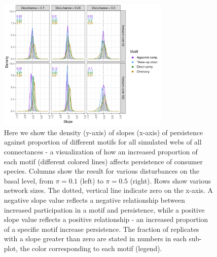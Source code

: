 \documentclass[12pt]{article}
\begin{document}
\begin{spacing}{2.0}
    
\begin{figure}[h!]
    \centering
        \includegraphics[width=0.75\textwidth]{figures/prop_dens_bp_vs_S_allC.pdf}
        \caption{Here we show the density (y-axis) of slopes (x-axis) of persistence against proportion of different motifs for all simulated webs of all connectances - a visualization of how an increased proportion of each motif (different colored lines) affects persistence of consumer species. Columns show the result for various disturbances on the basal level, from $\pi = 0.1$ (left) to $\pi = 0.5$ (right). Rows show various network sizes. The dotted, vertical line indicate zero on the x-axis. A negative slope value reflects a negative relationship between increased participation in a motif and persistence, while a positive slope value reflects a positive relationship - an increased proportion of a specific motif increase persistence. The fraction of replicates with a slope greater than zero are stated in numbers in each sub-plot, the color corresponding to each motif (legend). }
        \label{fig:density_prop_S}
    \end{figure}    

    
    

\end{spacing}
\end{document}

